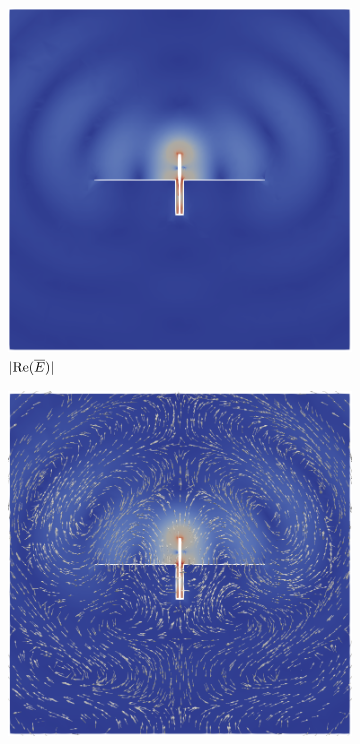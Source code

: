 \documentclass[titlepage]{article}
\renewcommand\_{\textunderscore\linebreak[1]}
\begin{document}
\begin{itemize}
\begin{figure}[H]
  \centering
  \begin{subfigure}{0.6\textwidth}
     \includegraphics[width=\linewidth]{../tutorials/OpenParEM3D/monopole_antenna/screenshots/Eplane_4p75GHz}
     \caption{$|\textnormal{Re}(\overline{E})|$}
  \end{subfigure}
  \par\bigskip
  \begin{subfigure}{0.6\textwidth}
     \includegraphics[width=\linewidth]{../tutorials/OpenParEM3D/monopole_antenna/screenshots/Eplane_vector_4p75GHz}

\end{subfigure}
\end{figure}
\end{itemize}
\end{document}
